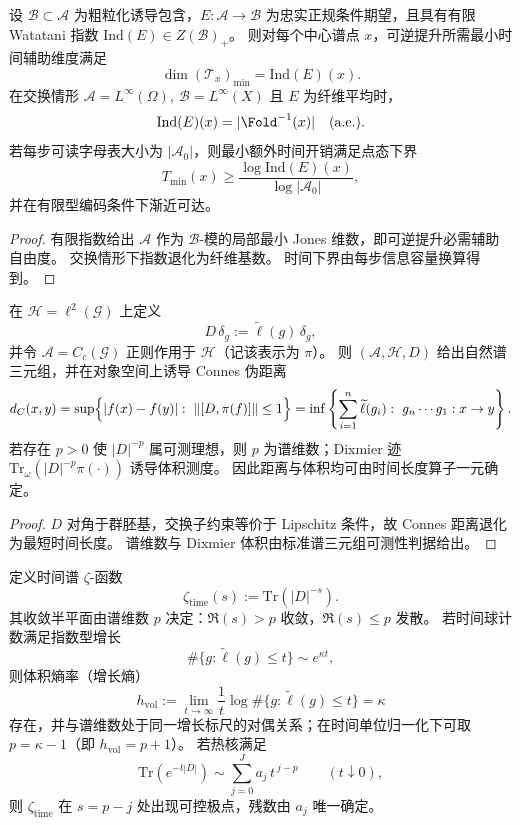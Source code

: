 \begin{theorem}\label{thm:xi-local-index-equals-local-time-fiber}
设 \(\mathcal B\subset\mathcal A\) 为粗粒化诱导包含，\(E:\mathcal A\to\mathcal B\) 为忠实正规条件期望，且具有有限 Watatani 指数 \(\mathrm{Ind}(E)\in Z(\mathcal B)_+\)。
则对每个中心谱点 \(x\)，可逆提升所需最小时间辅助维度满足
\[
\dim(\mathcal T_x)_{\min}=\mathrm{Ind}(E)(x).
\]
在交换情形
\(
\mathcal A=L^\infty(\Omega),\ \mathcal B=L^\infty(X)
\)
且 \(E\) 为纤维平均时，
\[
\mathrm{Ind}(E)(x)=|\Fold^{-1}(x)|\quad\text{(a.e.)}.
\]
若每步可读字母表大小为 \(|\mathcal A_0|\)，则最小额外时间开销满足点态下界
\[
T_{\min}(x)\ge \frac{\log \mathrm{Ind}(E)(x)}{\log |\mathcal A_0|},
\]
并在有限型编码条件下渐近可达。
\end{theorem}

\begin{proof}
有限指数给出 \(\mathcal A\) 作为 \(\mathcal B\)-模的局部最小 Jones 维数，即可逆提升必需辅助自由度。
交换情形下指数退化为纤维基数。
时间下界由每步信息容量换算得到。
\end{proof}

\begin{theorem}\label{thm:xi-time-spectral-triple-distance-volume}
在 \(\mathcal H=\ell^2(\mathcal G)\) 上定义
\[
D\,\delta_g:=\widetilde\ell(g)\,\delta_g,
\]
并令 \(\mathcal A=C_c(\mathcal G)\) 正则作用于 \(\mathcal H\)（记该表示为 \(\pi\)）。
则 \((\mathcal A,\mathcal H,D)\) 给出自然谱三元组，并在对象空间上诱导 Connes 伪距离
\[
d_C(x,y)
=
\sup\Bigl\{|f(x)-f(y)|:\ \|[D,\pi(f)]\|\le 1\Bigr\}
=
\inf\left\{
\sum_{i=1}^n\widetilde\ell(g_i):\ g_n\cdots g_1:x\to y
\right\}.
\]
若存在 \(p>0\) 使 \(|D|^{-p}\) 属可测理想，则 \(p\) 为谱维数；Dixmier 迹
\(
\mathrm{Tr}_\omega(|D|^{-p}\pi(\cdot))
\)
诱导体积测度。
因此距离与体积均可由时间长度算子一元确定。
\end{theorem}

\begin{proof}
\(D\) 对角于群胚基，交换子约束等价于 Lipschitz 条件，故 Connes 距离退化为最短时间长度。
谱维数与 Dixmier 体积由标准谱三元组可测性判据给出。
\end{proof}

\begin{theorem}\label{thm:xi-time-zeta-singularity-from-growth}
定义时间谱 \(\zeta\)-函数
\[
\zeta_{\mathrm{time}}(s):=\mathrm{Tr}(|D|^{-s}).
\]
其收敛半平面由谱维数 \(p\) 决定：\(\Re(s)>p\) 收敛，\(\Re(s)\le p\) 发散。
若时间球计数满足指数型增长
\[
\#\{g:\widetilde\ell(g)\le t\}\sim e^{\kappa t},
\]
则体积熵率（增长熵）
\[
h_{\mathrm{vol}}
:=\lim_{t\to\infty}\frac{1}{t}\log \#\{g:\widetilde\ell(g)\le t\}
=\kappa
\]
存在，并与谱维数处于同一增长标尺的对偶关系；在时间单位归一化下可取 \(p=\kappa-1\)（即 \(h_{\mathrm{vol}}=p+1\)）。
若热核满足
\[
\mathrm{Tr}(e^{-t|D|})
\sim
\sum_{j=0}^{J}a_j\,t^{\,j-p}
\qquad(t\downarrow 0),
\]
则 \(\zeta_{\mathrm{time}}\) 在 \(s=p-j\) 处出现可控极点，残数由 \(a_j\) 唯一确定。
\end{theorem}

